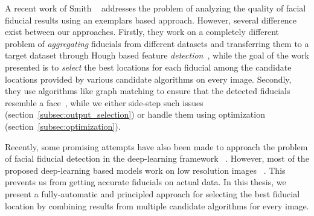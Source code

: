  A recent work of Smith \etal ~\cite{smithECCV14_ED} addresses the problem of analyzing the quality of facial fiducial
results using an exemplars based approach. However, several difference exist between our approaches.
Firstly, they work on a completely different problem of \emph{aggregating} fiducials from different datasets and transferring them to a target dataset through Hough based feature \emph{detection}~\cite{shenCVPR13_retrieval},
while the goal of the work presented is to \emph{select} the best locations for each fiducial among
the candidate locations provided by various candidate algorithms on every image. 
Secondly, they use algorithms like graph matching to ensure that the detected fiducials resemble a
face~\cite{zhouICCV13_EGM}, while we either side-step such issues
(section~\ref{subsec:output_selection}) or handle them using optimization
(section~\ref{subsec:optimization}).

Recently, some promising attempts have also been made to approach the problem of facial fiducial detection in the deep-learning framework ~\cite{zhangECCV14_deepfacealign}. However, most of the proposed deep-learning based models work on low resolution images ~\cite{zhangECCV14_deepfacealign,DBLP:journals/corr/ZhangLLT14}.
This prevents us from getting accurate fiducials on actual data.
In this thesis, we present a fully-automatic
and principled approach for selecting the best fiducial location by combining results from multiple
candidate algorithms for every image.

